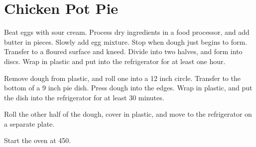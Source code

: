 \section{Chicken Pot Pie}
\begin{recipe}



Beat eggs with sour cream. Process dry ingredients in a food processor, and
add butter in pieces. Slowly add egg mixture. Stop when dough just begins to
form. Transfer to a floured surface and kneed. Divide into two halves, and form
into discs. Wrap in plastic and put into the refrigerator for at least one hour.

Remove dough from plastic, and roll one into a 12 inch circle. Transfer to the 
bottom of a 9 inch pie dish. Press dough into the edges. Wrap in plastic, and put
the dish into the refrigerator for at least 30 minutes. 

Roll the other half of the dough, cover in plastic, and move to the refrigerator
on a separate plate. 


Start the oven at 450\degree. 


\end{recipe}
